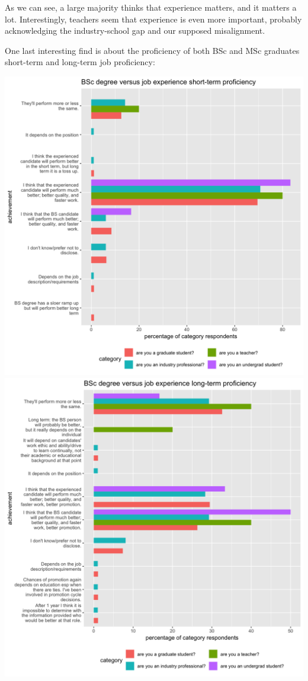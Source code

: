 \documentclass{sigchi}
\begin{document}
As we can see, a large majority thinks that experience matters, and it matters a lot. Interestingly, teachers seem that experience is even more important, probably acknowledging the industry-school gap and our supposed misalignment.

One last interesting find is about the proficiency of both BSc and MSc graduates short-term and long-term job proficiency:

\includegraphics[scale=0.2]{../data-analysis/plots_output/BSc_degree_versus_job_experience_short-term_proficiency.png}
\includegraphics[scale=0.2]{../data-analysis/plots_output/BSc_degree_versus_job_experience_long-term_proficiency.png}
\end{document}
